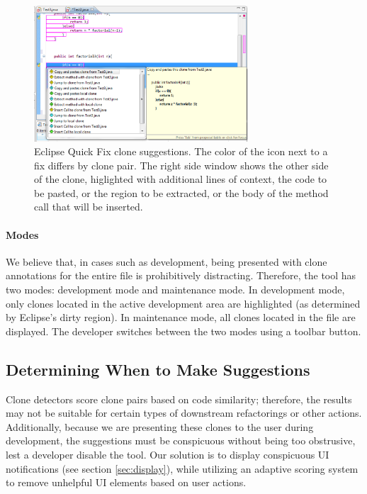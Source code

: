 \documentclass[nocopyrightspace,10pt]{sigplanconf}
\begin{document}
\begin{figure}[here]
\centering
\includegraphics[width=80mm]{img/screen1.eps}
\caption{Eclipse Quick Fix clone suggestions. The color of the icon
  next to a fix differs by clone pair. The right side window shows the
  other side of the clone, higlighted with additional lines of
  context, the code to be pasted, or the region to be extracted,
  or the body of the method call that will be inserted.}
\label{fig:screenshot}
\end{figure}

\paragraph{Modes}
We believe that, in cases such as development, being presented with
clone annotations for the entire file is prohibitively distracting.
Therefore, the tool has two modes: development mode and maintenance
mode.
In
development mode, only clones located in the active development area
are highlighted (as determined by Eclipse's dirty region). In
maintenance mode, all clones located in the file are displayed. The
developer switches between the two modes using a toolbar button.

\subsection{Determining When to Make Suggestions}

Clone detectors score clone pairs based on code similarity; therefore,
the results may not be suitable for certain types of downstream
refactorings or other actions.
Additionally,
because we are presenting these clones to the user during development,
the suggestions must be conspicuous without being too obstrusive, lest
a developer disable the tool.
Our solution is to display conspicuous UI notifications
(see section \ref{sec:display}), while utilizing an 
adaptive scoring system to remove unhelpful UI elements based
on user actions.  
\end{document}
